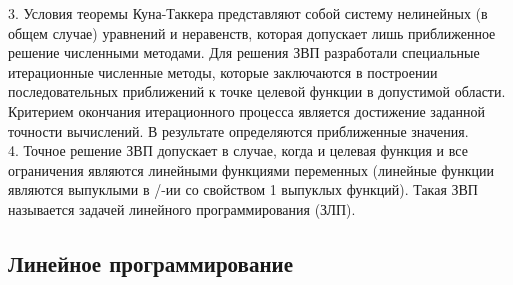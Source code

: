 3. Условия теоремы Куна-Таккера представляют собой систему нелинейных (в общем случае) уравнений и неравенств, которая допускает лишь приближенное решение численными методами. Для решения ЗВП разработали специальные итерационные численные методы, которые заключаются в построении последовательных приближений к точке целевой функции в допустимой области. Критерием окончания итерационного процесса является достижение заданной точности вычислений. В результате определяются приближенные значения. \\

4. Точное решение ЗВП допускает в случае, когда и целевая функция и все ограничения являются линейными функциями переменных (линейные функции являются выпуклыми в /-ии со свойством 1 выпуклых функций). Такая ЗВП называется задачей линейного программирования (ЗЛП).

\subsection*{Линейное программирование}

